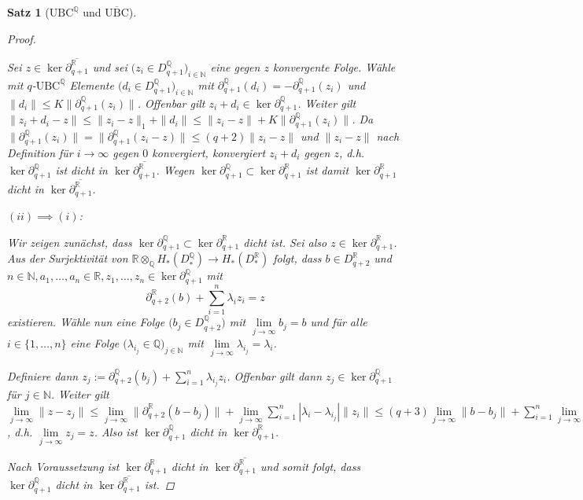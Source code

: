 \documentclass[a4paper,twoside,10pt]{scrreprt}
\newcommand{\UBC}{\text{UBC}}
\newcommand{\N}{\mathbb{N}}
\newcommand{\Q}{\mathbb{Q}}
\newcommand{\R}{\mathbb{R}}
\newtheorem{satz}{Satz}[section]
\theoremstyle{definition}
\begin{document}
\begin{satz}[$\UBC^{\Q}$ und $\overline{\UBC}$]
\begin{proof}
\begin{itemize}
Sei $z\in \ker \overline{\partial_{q+1}^{\R}}$ und sei $\bigl(z_i\in D_{q+1}^{\Q}\bigr)_{i\in \N}$ eine gegen $z$ konvergente Folge. Wähle mit $q$-$\UBC^{\Q}$ Elemente $\bigl(d_i\in D_{q+1}^{\Q}\bigr)_{i\in \N}$ mit $\partial_{q+1}^{\Q}(d_i)=-\partial_{q+1}^{\Q}(z_i)$ und $\|d_i\|\leq K\|\partial_{q+1}^{\Q}(z_i)\|$. Offenbar gilt $z_i+d_i\in \ker \partial_{q+1}^{\Q}$. Weiter gilt $\|z_i+d_i-z\|\leq \|z_i-z\|_1+\|d_i\|\leq\|z_i-z\|+K\|\partial_{q+1}^{\Q}(z_i)\|$. Da $\|\partial_{q+1}^{\Q}(z_i)\|=\|\partial_{q+1}^{\Q}(z_i-z)\|\leq (q+2)\|z_i-z\|$ und $\|z_i-z\|$ nach Definition für $i\to \infty$ gegen $0$ konvergiert, konvergiert $z_i+d_i$ gegen $z$, d.h. $\ker \partial_{q+1}^{\Q}$ ist dicht in $\ker \overline{\partial_{q+1}^{\R}}$. Wegen $\ker \partial_{q+1}^{\Q}\subset\ker \partial_{q+1}^{\R}$ ist damit $\ker \partial_{q+1}^{\R}$ dicht in $\ker \overline{\partial_{q+1}^{\R}}$.
\end{itemize}
$(ii)\implies(i)$:\par
Wir zeigen zunächst, dass $\ker\partial_{q+1}^{\Q}\subset \ker\partial_{q+1}^{\R}$ dicht ist. Sei also $z\in \ker\partial_{q+1}^{\R}$. Aus der Surjektivität von $\R\otimes_{\Q}H_*(D_*^{\Q})\to H_*(D_*^{\R})$ folgt, dass $b\in D_{q+2}^{\R}$ und $n\in\N,a_1,\ldots,a_n\in\R,z_1,\ldots,z_n\in \ker\partial_{q+1}^{\Q}$ mit 
\begin{equation*}
\partial_{q+2}^{\R}(b)+\sum\limits_{i=1}^n\lambda_iz_i=z
\end{equation*}
existieren. Wähle nun eine Folge $\bigl(b_j\in D_{q+2}^{\Q}\bigr)$ mit $\lim\limits_{j\to\infty}b_j=b$ und für alle $i\in \{1,\ldots,n\}$ eine Folge $\bigl(\lambda_{i_j}\in\Q\bigr)_{j\in\N}$ mit $\lim\limits_{j\to\infty}\lambda_{i_j}=\lambda_i$.\par
Definiere dann $z_j:=\partial_{q+2}^{\Q}(b_j)+\sum\limits_{i=1}^n\lambda_{i_j}z_i$. Offenbar gilt dann $z_j\in\ker\partial_{q+1}^{\Q}$ für $j\in\N$. Weiter gilt $\lim\limits_{j\to\infty}\|z-z_j\|\leq \lim\limits_{j\to\infty}\|\partial_{q+2}^{\R}(b-b_j)\|+\lim\limits_{j\to\infty}\sum\limits_{i=1}^n|\lambda_i-\lambda_{i_j}|\|z_i\|\leq (q+3)\lim\limits_{j\to\infty}\|b-b_j\|+\sum\limits_{i=1}^n\lim\limits_{j\to\infty}|\lambda_i-\lambda_{i_j}|\|z_i\|=0$, d.h. $\lim\limits_{j\to\infty}z_j=z$. Also ist $\ker\partial_{q+1}^{\Q}$ dicht in $\ker\partial_{q+1}^{\R}$.\par
Nach Voraussetzung ist $\ker \partial_{q+1}^{\R}$ dicht in $\ker \overline{\partial_{q+1}^{\R}}$ und somit folgt, dass $\ker \partial_{q+1}^{\Q}$ dicht in $\ker \overline{\partial_{q+1}^{\R}}$ ist.\par

\end{proof}
\end{satz}
\end{document}
